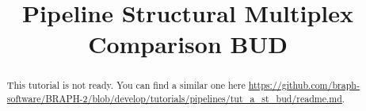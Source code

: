 \documentclass[justified]{tufte-handout}
\title{Pipeline Structural Multiplex Comparison BUD}
\begin{document}
\maketitle

\begin{abstract}
\noindent
This tutorial is not ready. You can find a similar one here \url{https://github.com/braph-software/BRAPH-2/blob/develop/tutorials/pipelines/tut_a_st_bud/readme.md}.
\end{abstract}
\end{document}
